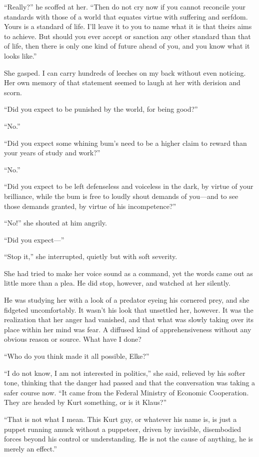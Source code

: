 ``Really?'' he scoffed at her. ``Then do not cry now if you cannot reconcile your standards with those of a world that equates virtue with suffering and serfdom. Yours is a standard of life. I'll leave it to you to name what it is that theirs aims to achieve. But should you ever accept or sanction any other standard than that of life, then there is only one kind of future ahead of you, and you know what it looks like.''

She gasped. I can carry hundreds of leeches on my back without even noticing. Her own memory of that statement seemed to laugh at her with derision and scorn.

``Did you expect to be punished by the world, for being good?''

``No.''

``Did you expect some whining bum's need to be a higher claim to reward than your years of study and work?''

``No.''

``Did you expect to be left defenseless and voiceless in the dark, by virtue of your brilliance, while the bum is free to loudly shout demands of you---and to see those demands granted, by virtue of his incompetence?''

``No!'' she shouted at him angrily.

``Did you expect---''

``Stop it,'' she interrupted, quietly but with soft severity.

She had tried to make her voice sound as a command, yet the words came out as little more than a plea. He did stop, however, and watched at her silently.

He was studying her with a look of a predator eyeing his cornered prey, and she fidgeted uncomfortably. It wasn't his look that unsettled her, however. It was the realization that her anger had vanished, and that what was slowly taking over its place within her mind  was fear. A diffused kind of apprehensiveness without any obvious reason or source. What have I done?

``Who do you think made it all possible, Elke?''

``I do not know, I am not interested in politics,'' she said, relieved by his softer tone, thinking that the danger had passed and that the conversation was taking a safer course now. ``It came from the Federal Ministry of Economic Cooperation. They are headed by Kurt something, or is it Klaus?''

``That is not what I mean. This Kurt guy, or whatever his name is, is just a puppet running amuck without a puppeteer, driven by invisible, disembodied forces beyond his control or understanding. He is not the cause of anything, he is merely an effect.''

